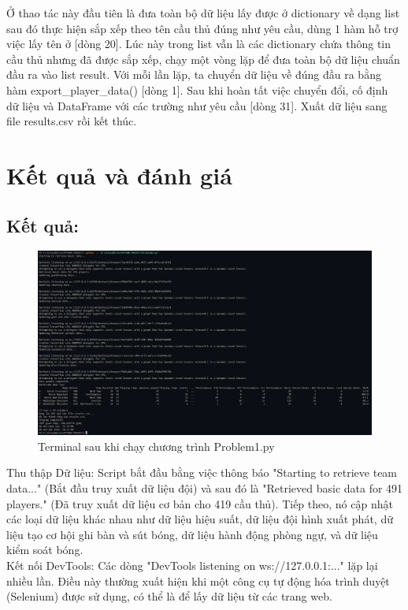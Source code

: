 \documentclass[12pt]{report}
\begin{document}
{Ở thao tác này đầu tiên là đưa toàn bộ dữ liệu lấy được ở dictionary về dạng list sau đó thực hiện sắp xếp theo tên cầu thủ đúng như yêu cầu,  dùng 1 hàm hỗ trợ việc lấy tên ở [dòng 20]. Lúc này trong list vẫn là các dictionary chứa thông tin cầu thủ nhưng đã được sắp xếp, chạy một vòng lặp để đưa toàn bộ dữ liệu chuẩn đầu ra vào list result. Với mỗi lần lặp, ta chuyển dữ liệu về đúng đầu ra bằng hàm export\_player\_data() [dòng 1]. Sau khi hoàn tất việc chuyển đổi, cố định dữ liệu và DataFrame với các trường như yêu cầu [dòng 31]. Xuất dữ liệu sang file results.csv rồi kết thúc.
\clearpage
\section{Kết quả và đánh giá}
\subsection{Kết quả:}
\begin{figure}[h]
    \centering
    \includegraphics[width=\textwidth]{Terminal.png}
    \caption{Terminal sau khi chạy chương trình Problem1.py}
    \label{fig:terminal}
\end{figure}
Thu thập Dữ liệu: Script bắt đầu bằng việc thông báo "Starting to retrieve team data..." (Bắt đầu truy xuất dữ liệu đội) và sau đó là "Retrieved basic data for 491 players." (Đã truy xuất dữ liệu cơ bản cho 419 cầu thủ). Tiếp theo, nó cập nhật các loại dữ liệu khác nhau như dữ liệu hiệu suất, dữ liệu đội hình xuất phát, dữ liệu tạo cơ hội ghi bàn và sút bóng, dữ liệu hành động phòng ngự, và dữ liệu kiểm soát bóng.
\\
Kết nối DevTools: Các dòng "DevTools listening on ws://127.0.0.1:..." lặp lại nhiều lần. Điều này thường xuất hiện khi một công cụ tự động hóa trình duyệt (Selenium) được sử dụng, có thể là để lấy dữ liệu từ các trang web.\\
}
\end{document}
